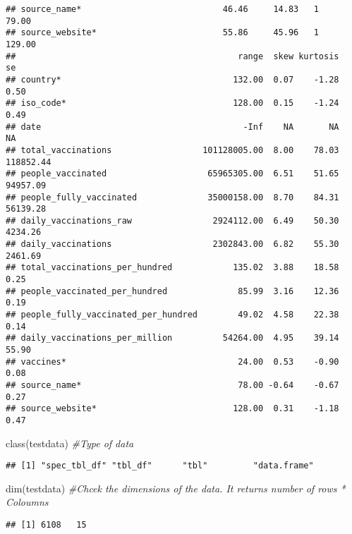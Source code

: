 \documentclass[
]{article}
\newenvironment{Shaded}{\begin{snugshade}}{\end{snugshade}}
\newcommand{\CommentTok}[1]{\textcolor[rgb]{0.56,0.35,0.01}{\textit{#1}}}
\newcommand{\FunctionTok}[1]{\textcolor[rgb]{0.00,0.00,0.00}{#1}}
\newcommand{\NormalTok}[1]{#1}
\begin{document}
\begin{verbatim}
## source_name*                            46.46     14.83   1        79.00
## source_website*                         55.86     45.96   1       129.00
##                                            range  skew kurtosis        se
## country*                                  132.00  0.07    -1.28      0.50
## iso_code*                                 128.00  0.15    -1.24      0.49
## date                                        -Inf    NA       NA        NA
## total_vaccinations                  101128005.00  8.00    78.03 118852.44
## people_vaccinated                    65965305.00  6.51    51.65  94957.09
## people_fully_vaccinated              35000158.00  8.70    84.31  56139.28
## daily_vaccinations_raw                2924112.00  6.49    50.30   4234.26
## daily_vaccinations                    2302843.00  6.82    55.30   2461.69
## total_vaccinations_per_hundred            135.02  3.88    18.58      0.25
## people_vaccinated_per_hundred              85.99  3.16    12.36      0.19
## people_fully_vaccinated_per_hundred        49.02  4.58    22.38      0.14
## daily_vaccinations_per_million          54264.00  4.95    39.14     55.90
## vaccines*                                  24.00  0.53    -0.90      0.08
## source_name*                               78.00 -0.64    -0.67      0.27
## source_website*                           128.00  0.31    -1.18      0.47
\end{verbatim}

\begin{Shaded}
\begin{Highlighting}[]
\FunctionTok{class}\NormalTok{(testdata) }\CommentTok{\#Type of data}
\end{Highlighting}
\end{Shaded}

\begin{verbatim}
## [1] "spec_tbl_df" "tbl_df"      "tbl"         "data.frame"
\end{verbatim}

\begin{Shaded}
\begin{Highlighting}[]
\FunctionTok{dim}\NormalTok{(testdata) }\CommentTok{\#Chcek the dimensions of the data. It returns number of rows * Coloumns}
\end{Highlighting}
\end{Shaded}

\begin{verbatim}
## [1] 6108   15
\end{verbatim}
\end{document}
